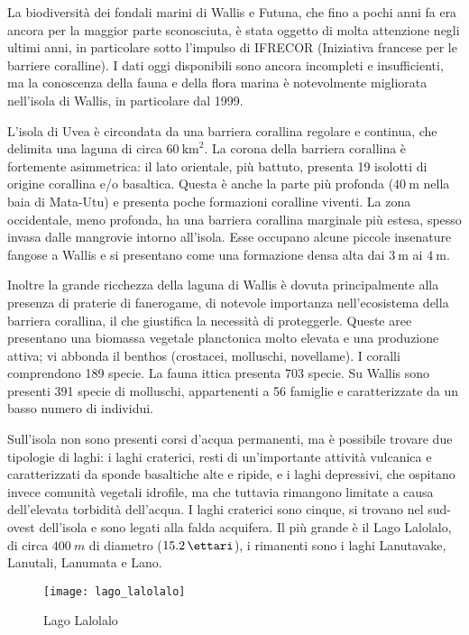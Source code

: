 \documentclass[fleqn,11pt]{SelfArx} %
\begin{document}
La biodiversità dei fondali marini di Wallis e Futuna, che fino a pochi anni fa era ancora per la maggior parte sconosciuta, è stata oggetto di molta attenzione negli ultimi anni, in particolare sotto l'impulso di IFRECOR (Iniziativa francese per le barriere coralline).
I dati oggi disponibili sono ancora incompleti e insufficienti, ma la conoscenza della fauna e della flora marina è notevolmente migliorata nell'isola di Wallis, in particolare dal 1999. 

L'isola di Uvea è circondata da una barriera corallina regolare e continua, che delimita una laguna di circa $\SI{60}{\km\squared}$.
La corona della barriera corallina è fortemente asimmetrica: il lato orientale, più battuto, presenta 19 isolotti di origine corallina e/o basaltica. 
Questa è anche la parte più profonda ($\SI{40}{\m}$ nella baia di Mata-Utu) e presenta poche formazioni coralline viventi.
La zona occidentale, meno profonda, ha una barriera corallina marginale più estesa, spesso invasa dalle mangrovie intorno all'isola. 
Esse occupano alcune piccole insenature fangose a Wallis e si presentano come una formazione densa alta dai $\SI{3}{\m}$ ai $\SI{4}{\m}$.

Inoltre la grande ricchezza della laguna di Wallis è dovuta principalmente alla presenza di praterie di fanerogame, di notevole importanza nell'ecosistema della barriera corallina, il che giustifica la necessità di proteggerle. Queste aree presentano una biomassa vegetale planctonica molto elevata e una produzione attiva; vi abbonda il benthos (crostacei, molluschi, novellame).
I coralli comprendono 189 specie.
La fauna ittica presenta 703 specie.
Su Wallis sono presenti 391 specie di molluschi, appartenenti a 56 famiglie e caratterizzate da un basso numero di individui.

Sull'isola non sono presenti corsi d'acqua permanenti, ma è possibile trovare due tipologie di laghi: i laghi craterici, resti di un'importante attività vulcanica e caratterizzati da sponde basaltiche alte e ripide, e i laghi depressivi, che ospitano invece comunità vegetali idrofile, ma che tuttavia rimangono limitate a causa dell'elevata torbidità dell'acqua. 
I laghi craterici sono cinque, si trovano nel sud-ovest dell'isola e sono legati alla falda acquifera. 
Il più grande è il Lago Lalolalo, di circa \(\SI{400}{m}\) di diametro ($\SI{15,2}{\ettari}$), i rimanenti sono i laghi Lanutavake, Lanutali, Lanumata e Lano.

\begin{figure}[ht]\centering
	\texttt{[image: lago\_lalolalo]}
	\caption{Lago Lalolalo}
\end{figure}
\end{document}
